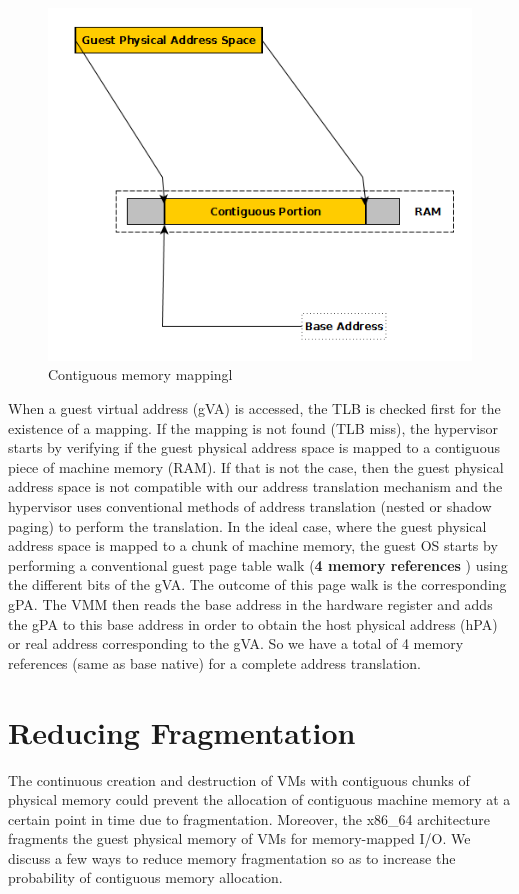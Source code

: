 \documentclass[sigconf]{sigplanconf}
\begin{document}
        \begin{figure}[!h]
        	\centering
        	\includegraphics[scale=0.25]{map.png}
        	\caption{Contiguous memory mappingl}
        	\label{fig:cont_map}
        \end{figure}
       
       When a guest virtual address (gVA) is accessed, the TLB is checked first for the existence of a mapping. If the mapping is not found (TLB miss), the hypervisor starts by verifying if the guest physical address space is mapped to a contiguous piece of machine memory (RAM). If that is not the case, then the guest physical address space is not compatible with our address translation mechanism and the hypervisor uses conventional methods of address translation (nested or shadow paging) to perform the translation. In the ideal case, where the guest physical address space is mapped to a chunk of machine memory, the guest OS starts by performing a conventional guest page table walk (\textbf{4 memory references }) using the different bits of the gVA. The outcome of this page walk is the corresponding gPA. The VMM then reads the base address in the hardware register and adds the gPA to this base address in order to obtain the host physical address (hPA) or real address corresponding to the gVA. So we have a total of 4 memory references (same as base native) for a complete address translation. 
       
       \section{Reducing Fragmentation}
       The continuous creation and destruction of VMs with contiguous chunks of physical memory could prevent the allocation of contiguous machine memory at a certain point in time due to fragmentation. Moreover, the x86\_64 architecture fragments the guest physical memory of VMs for memory-mapped I/O\cite{gandhi}. We discuss a few ways to reduce memory fragmentation so as to increase the probability of contiguous memory allocation.
       
\end{document}
